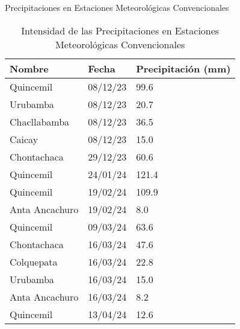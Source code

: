 \documentclass[aspectratio=169,xcolor=dvipsnames]{beamer}
\begin{document}
\begin{frame}{Precipitaciones en Estaciones Meteorológicas Convencionales}
\centering
\begin{table}
    \small
    \begin{tabular}{l l l}
        \toprule
        \textbf{Nombre} & \textbf{Fecha} & \textbf{Precipitación (mm)} \\
        \midrule            
        Quincemil & 08/12/23 & 99.6 \\ 
        Urubamba & 08/12/23 & 20.7 \\ 
        Chacllabamba & 08/12/23 & 36.5 \\
        Caicay & 08/12/23 & 15.0 \\
        Chontachaca & 29/12/23 & 60.6 \\
        Quincemil & 24/01/24 & 121.4 \\
        Quincemil & 19/02/24 & 109.9 \\
        Anta Ancachuro & 19/02/24 & 8.0 \\
        Quincemil & 09/03/24 & 63.6 \\
        Chontachaca & 16/03/24 & 47.6 \\
        Colquepata & 16/03/24 & 22.8 \\
        Urubamba & 16/03/24 & 15.0 \\
        Anta Ancachuro & 16/03/24 & 8.2 \\
        Quincemil & 13/04/24 & 12.6 \\
        \bottomrule
    \end{tabular}
    \caption{\centering Intensidad de las Precipitaciones en Estaciones Meteorológicas Convencionales}
\end{table}
\end{frame}
\end{document}
